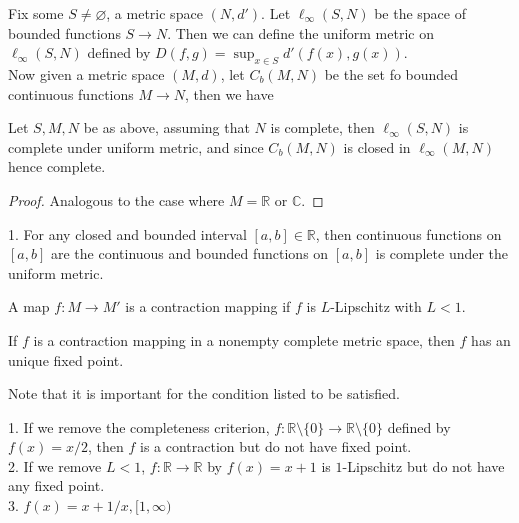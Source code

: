 Fix some $S\neq\varnothing$, a metric space $(N,d')$.
Let $\ell_\infty (S,N)$ be the space of bounded functions $S\to N$.
Then we can define the uniform metric on $\ell_\infty(S,N)$ defined by $D(f,g)=\sup_{x\in S}d'(f(x),g(x))$.\\
Now given a metric space $(M,d)$, let $C_b(M,N)$ be the set fo bounded continuous functions $M\to N$, then we have
\begin{theorem}
    Let $S,M,N$ be as above, assuming that $N$ is complete, then $\ell_\infty(S,N)$ is complete under uniform metric, and since $C_b(M,N)$ is closed in $\ell_\infty(M,N)$ hence complete.
\end{theorem}
\begin{proof}
    Analogous to the case where $M=\mathbb R$ or $\mathbb C$.
\end{proof}
\begin{example}
    1. For any closed and bounded interval $[a,b]\in\mathbb R$, then continuous functions on $[a,b]$ are the continuous and bounded functions on $[a,b]$ is complete under the uniform metric.
\end{example}
\begin{definition}
    A map $f:M\to M'$ is a contraction mapping if $f$ is $L$-Lipschitz with $L<1$.
\end{definition}
\begin{theorem}\label{banach}
    If $f$ is a contraction mapping in a nonempty complete metric space, then $f$ has an unique fixed point.
\end{theorem}
Note that it is important for the condition listed to be satisfied.
\begin{example}
    1. If we remove the completeness criterion, $f:\mathbb R\setminus\{0\}\to\mathbb R\setminus\{0\}$ defined by $f(x)=x/2$, then $f$ is a contraction but do not have fixed point.\\
    2. If we remove $L<1$, $f:\mathbb R\to\mathbb R$ by $f(x)=x+1$ is $1$-Lipschitz but do not have any fixed point.\\
    3. $f(x)=x+1/x,[1,\infty)$
\end{example}
